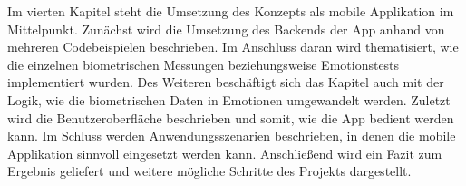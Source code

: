 Im vierten Kapitel steht die Umsetzung des Konzepts als mobile Applikation im Mittelpunkt. Zunächst wird die Umsetzung des Backends der App anhand von mehreren Codebeispielen beschrieben. Im Anschluss daran wird thematisiert, wie die einzelnen biometrischen Messungen beziehungsweise Emotionstests implementiert wurden. Des Weiteren beschäftigt sich das Kapitel auch mit der Logik, wie die biometrischen Daten in Emotionen umgewandelt werden. Zuletzt wird die Benutzeroberfläche beschrieben und somit, wie die App bedient werden kann. \newline
Im Schluss werden Anwendungsszenarien beschrieben, in denen die mobile Applikation sinnvoll eingesetzt werden kann. Anschließend wird ein Fazit zum Ergebnis geliefert und weitere mögliche Schritte des Projekts dargestellt.